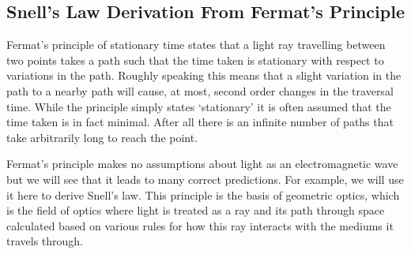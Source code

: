     \subsection{Snell's Law Derivation From Fermat's Principle}\label{sec:snell's law fermat's principle}
    Fermat's principle of stationary time states that a light ray travelling between two points takes a path such that the time taken is stationary with respect to variations in the path.
    Roughly speaking this means that a slight variation in the path to a nearby path will cause, at most, second order changes in the traversal time.
    While the principle simply states `stationary' it is often assumed that the time taken is in fact minimal.
    After all there is an infinite number of paths that take arbitrarily long to reach the point.
    
    Fermat's principle makes no assumptions about light as an electromagnetic wave but we will see that it leads to many correct predictions.
    For example, we will use it here to derive Snell's law.
    This principle is the basis of geometric optics, which is the field of optics where light is treated as a ray and its path through space calculated based on various rules for how this ray interacts with the mediums it travels through.
    
